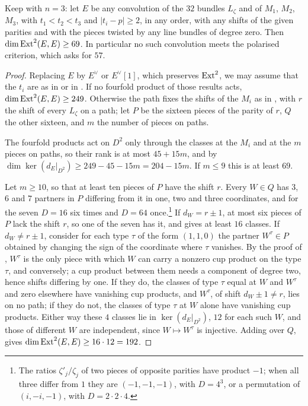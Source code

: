 \begin{theorem}
\label{thm:noconvolution}
Keep  with $n=3$: let $E$ be any convolution of
the $32$ bundles $L_{\zeta}$ and of $M_{1}$, $M_{2}$, $M_{3}$, with
$t_{1}<t_{2}<t_{3}$ and $|t_{i}-p|\ge2$, in any order, with any shifts of the
given parities and with the pieces twisted by any line bundles of degree
zero. Then $\dim\operatorname{Ext}^{2}(E,E)\ge69$. In particular no such convolution meets
the polarised criterion, which asks for $57$.
\end{theorem}

\begin{proof}
Replacing $E$ by $E^{\vee}$ or $E^{\vee}[1]$, which preserves $\operatorname{Ext}^{2}$, we
may assume that the $t_{i}$ are as in  or in
. If no fourfold product of those results acts,
$\dim\operatorname{Ext}^{2}(E,E)\ge249$. Otherwise the path fixes the shifts of the
$M_{i}$ as in , with $r$ the shift of every $L_{\zeta}$
on a path; let $P$ be the sixteen pieces of the parity of $r$, $Q$ the
other sixteen, and $m$ the number of pieces on paths.

The fourfold products act on $D^{2}$ only through the classes at the
$M_{i}$ and at the $m$ pieces on paths, so their rank is at most $45+15m$,
and by 
$\dim\ker(d_{E}|_{D^{2}})\ge249-45-15m=204-15m$. If $m\le9$ this is at
least $69$.

Let $m\ge10$, so that at least ten pieces of $P$ have the shift $r$. Every
$W\in Q$ has $3$, $6$ and $7$ partners in $P$ differing from it in one, two
and three coordinates, and for the seven $D=16$ six times and $D=64$
once.\footnote{The ratios $\zeta'_{j}/\zeta_{j}$ of two pieces of opposite
parities have product $-1$; when all three differ from $1$ they are
$(-1,-1,-1)$, with $D=4^{3}$, or a permutation of $(i,-i,-1)$, with
$D=2\cdot2\cdot4$.} If $d_{W}=r\pm1$, at most six pieces of $P$ lack the
shift $r$, so one of the seven has it, and  gives at least
$16$ classes. If $d_{W}\ne r\pm1$, consider for each type $\tau$ of the form
$(1,1,0)$ the partner $W^{\tau}\in P$ obtained by changing the sign of the
coordinate where $\tau$ vanishes. By the proof of ,
$W^{\tau}$ is the only piece with which $W$ can carry a nonzero cup product
on the type $\tau$, and conversely; a cup product between them needs a
component of degree two, hence shifts differing by one. If they do, the
classes of type $\tau$ equal at $W$ and $W^{\tau}$ and zero elsewhere have
vanishing cup products, and $W^{\tau}$, of shift $d_{W}\pm1\ne r$, lies on no
path; if they do not, the classes of type $\tau$ at $W$ alone have vanishing
cup products. Either way these $4$ classes lie in $\ker(d_{E}|_{D^{2}})$,
$12$ for each such $W$, and those of different $W$ are independent, since
$W\mapsto W^{\tau}$ is injective. Adding over $Q$, 
gives $\dim\operatorname{Ext}^{2}(E,E)\ge16\cdot12=192$.
\end{proof}

